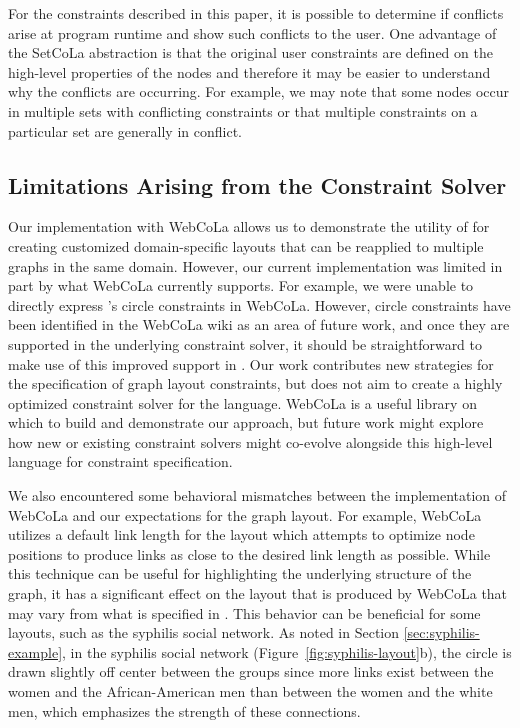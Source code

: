 For the constraints described in this paper, it is possible to determine if
conflicts arise at program runtime and show such conflicts to the user. One
advantage of the SetCoLa abstraction is that the original user constraints
are defined on the high-level properties of the nodes and therefore it may
be easier to understand why the conflicts are occurring. For example, we may
note that some nodes occur in multiple sets with conflicting constraints
or that multiple constraints on a particular set are generally in conflict.

\subsection{Limitations Arising from the Constraint Solver}



Our implementation with WebCoLa allows us to demonstrate the utility of
\projectname for creating customized domain-specific layouts that can be
reapplied to multiple graphs in the same domain. However, our current
implementation was limited in part by what WebCoLa currently supports. For
example, we were unable to directly express \projectname's circle constraints in
WebCoLa.  However, circle constraints have been identified in the WebCoLa
wiki as an area of future work, and once they are supported in the
underlying constraint solver, it should be straightforward to make use of
this improved support in \projectname.
Our work contributes new strategies for the
specification of graph layout constraints, but does not aim to create a
highly optimized constraint solver for the language. WebCoLa is a useful
library on which to build and demonstrate our approach, but 
future work might explore how new or existing constraint solvers might
co-evolve alongside this high-level language for constraint specification.

We also encountered some behavioral mismatches between the implementation
of WebCoLa and our expectations for the graph layout. For example, WebCoLa
utilizes a default link length for the layout which attempts to optimize
node positions to produce links as close to the desired link length as
possible. While this technique can be useful for highlighting the underlying 
structure of the graph, it has a significant effect on the layout that is
produced by WebCoLa that may vary from what is specified in \projectname.
This behavior can be beneficial for some layouts, such as the syphilis social network.
As noted in Section \ref{sec:syphilis-example}, in the syphilis social network
(Figure~\ref{fig:syphilis-layout}b), the circle is drawn slightly off
center between the groups since more links exist between the
women and the African-American men than between the women and
the white men, which emphasizes the strength of these
connections.

